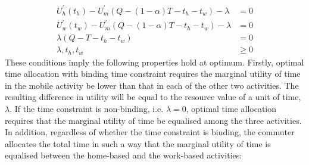 \documentclass[12pt,a4paper,british]{article}
\theoremstyle{definition}
\theoremstyle{plain}
\theoremstyle{plain}
\begin{document}
\begin{equation}
\begin{aligned}U_{h}^{\prime}\left(t_{h}\right)-U_{m}^{\prime}\left(Q-\left(1-\alpha\right)T-t_{h}-t_{w}\right)-\lambda & =0\\
U_{w}^{\prime}\left(t_{w}\right)-U_{m}^{\prime}\left(Q-\left(1-\alpha\right)T-t_{h}-t_{w}\right)-\lambda & =0\\
\lambda\left(Q-T-t_{h}-t_{w}\right) & =0\\
\lambda,t_{h},t_{w} & \geq0
\end{aligned}
\label{eq:foc_deterministic}
\end{equation}
These conditions imply the following properties hold at optimum. Firstly,
optimal time allocation with binding time constraint requires the
marginal utility of time in the mobile activity be lower than that
in each of the other two activities. The resulting difference in utility
will be equal to the resource value of a unit of time, $\lambda$.
If the time constraint is non-binding, i.e. $\lambda=0$, optimal
time allocation requires that the marginal utility of time be equalised
among the three activities. In addition, regardless of whether the
time constraint is binding, the commuter allocates the total time
in such a way that the marginal utility of time is equalised between
the home-based and the work-based activities:
\end{document}
